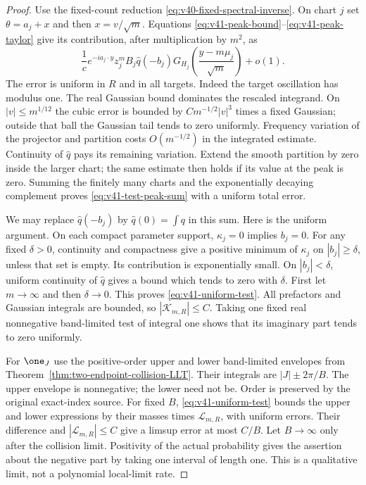 \begin{proof}
Use the fixed-count reduction
\eqref{eq:v40-fixed-spectral-inverse}. On chart $j$ set
$\theta=a_j+x$ and then $x=v/\sqrt m$. Equations
\eqref{eq:v41-peak-bound}--\eqref{eq:v41-peak-taylor} give its
contribution, after multiplication by $m^2$, as
\begin{equation}\label{eq:v41-test-peak-sum}
 \frac1c e^{-ia_j\cdot y}z_j^m B_j\widehat q(-b_j)
            G_{H_j}\!\left(\frac{y-m\mu_j}{\sqrt m}\right)+o(1).
\end{equation}
The error is uniform in $R$ and in all targets. Indeed the target
oscillation has modulus one. The real Gaussian bound dominates the
rescaled integrand. On $|v|\le m^{1/12}$ the cubic error is bounded by
$Cm^{-1/2}|v|^3$ times a fixed Gaussian; outside that ball the Gaussian
tail tends to zero uniformly. Frequency variation of the projector
and partition costs $O(m^{-1/2})$ in the integrated estimate.
Continuity of $\widehat q$ pays its remaining variation. Extend the
smooth partition by zero inside the larger chart; the same estimate
then holds if its value at the peak is zero. Summing the finitely many
charts and the exponentially decaying complement proves
\eqref{eq:v41-test-peak-sum} with a uniform total error.

We may replace $\widehat q(-b_j)$ by $\widehat q(0)=\int q$ in this
sum. Here is the uniform argument. On each compact parameter support,
$\kappa_j=0$ implies $b_j=0$. For any fixed $\delta>0$, continuity and
compactness give a positive minimum of $\kappa_j$ on $|b_j|\ge\delta$,
unless that set is empty. Its contribution is exponentially small.
On $|b_j|<\delta$, uniform continuity of $\widehat q$ gives a bound
which tends to zero with $\delta$. First let $m\to\infty$ and then
$\delta\to0$. This proves \eqref{eq:v41-uniform-test}. All prefactors
and Gaussian integrals are bounded, so $|\mathcal K_{m,R}|\le C$.
Taking one fixed real nonnegative band-limited test of integral one
shows that its imaginary part tends to zero uniformly.

For $\one_J$ use the positive-order upper and lower band-limited
envelopes from Theorem~\ref{thm:two-endpoint-collision-LLT}. Their
integrals are $|J|\pm2\pi/B$. The upper envelope is nonnegative; the
lower need not be. Order is preserved by the original exact-index
source. For fixed $B$, \eqref{eq:v41-uniform-test} bounds the upper
and lower expressions by their masses times $\mathcal L_{m,R}$,
with uniform errors. Their difference and $|\mathcal L_{m,R}|\le C$
give a limsup error at most $C/B$. Let $B\to\infty$ only after the
collision limit. Positivity of the actual probability gives the
assertion about the negative part by taking one interval of length
one. This is a qualitative limit, not a polynomial local-limit rate.


\end{proof}
